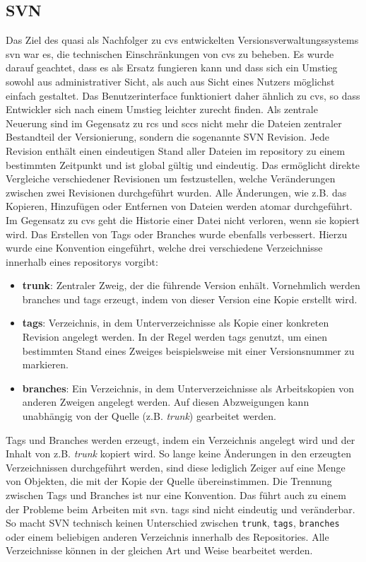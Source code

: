 \subsection{SVN}\label{sec:svn}
Das Ziel des quasi als Nachfolger zu \acrshort{cvs} entwickelten
Versionsverwaltungssystems \acrfull{svn} war es, die technischen
Einschränkungen von \acrshort{cvs} zu beheben. Es wurde darauf geachtet, dass
es als Ersatz fungieren kann und dass sich ein Umstieg sowohl aus
administrativer Sicht, als auch aus Sicht eines Nutzers möglichst einfach gestaltet.
Das Benutzerinterface funktioniert daher ähnlich zu \acrshort{cvs}, so dass
Entwickler sich nach einem Umstieg leichter zurecht finden. Als zentrale
Neuerung sind im Gegensatz zu \acrshort{rcs} und \mbox{\acrshort{sccs}} nicht mehr
die Dateien zentraler Bestandteil der Versionierung, sondern die sogenannte SVN
Revision. Jede Revision enthält einen eindeutigen Stand aller Dateien im
\gls{repository} zu einem bestimmten Zeitpunkt und ist global gültig und
eindeutig. Das ermöglicht direkte Vergleiche verschiedener Revisionen um
festzustellen, welche Veränderungen zwischen zwei Revisionen durchgeführt
wurden. Alle Änderungen, wie z.B. das Kopieren, Hinzufügen oder Entfernen von
Dateien werden atomar durchgeführt. Im Gegensatz zu \acrshort{cvs} geht die
Historie einer Datei nicht verloren, wenn sie kopiert wird. Das Erstellen von
Tags oder Branches wurde ebenfalls verbessert. Hierzu wurde eine Konvention
eingeführt, welche drei verschiedene Verzeichnisse innerhalb eines
\glspl{repository} vorgibt:

\begin{itemize}
\item \textbf{trunk}: Zentraler Zweig, der die führende Version enhält.
      Vornehmlich werden \gls{branch}es und \glspl{tag} erzeugt, indem von
      dieser Version eine Kopie erstellt wird.
\item \textbf{tags}: Verzeichnis, in dem Unterverzeichnisse als
      Kopie einer konkreten Revision angelegt werden. In der Regel werden
      \glspl{tag} genutzt, um einen bestimmten Stand eines Zweiges
      beispielsweise mit einer Versionsnummer zu markieren.
\item \textbf{branches}: Ein Verzeichnis, in dem Unterverzeichnisse als
      Arbeitskopien von anderen Zweigen angelegt werden. Auf diesen
      Abzweigungen kann unabhängig von der Quelle (z.B. \textit{trunk})
      gearbeitet werden.
\end{itemize}

Tags und Branches werden erzeugt, indem ein Verzeichnis angelegt wird und der
Inhalt von z.B. \textit{trunk} kopiert wird. So lange keine Änderungen in den
erzeugten Verzeichnissen durchgeführt werden, sind diese lediglich Zeiger auf
eine Menge von Objekten, die mit der Kopie der Quelle übereinstimmen. Die
Trennung zwischen Tags und Branches ist nur eine Konvention. Das führt auch zu
einem der Probleme beim Arbeiten mit \acrlong{svn}. \glspl{tag} sind nicht
eindeutig und veränderbar. So macht SVN technisch keinen Unterschied zwischen
\texttt{trunk}, \texttt{tags}, \texttt{branches} oder einem beliebigen anderen
Verzeichnis innerhalb des Repositories. Alle Verzeichnisse können in der
gleichen Art und Weise bearbeitet werden. \cite[S.~383-385]{cd}

